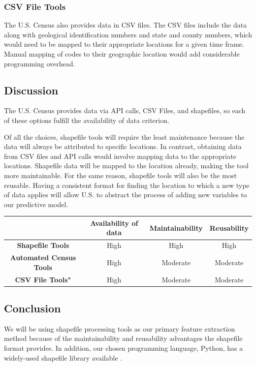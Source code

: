 \documentclass[onecolumn, draftclsnofoot,10pt, compsoc]{IEEEtran}
\begin{document}
        \subsubsection{CSV File Tools}
        The U.S. Census also provides data in CSV files. 
        The CSV files include the data along with geological identification numbers and state and county numbers, which would need to be mapped to their appropriate locations for a given time frame. 
        Manual mapping of codes to their geographic location would add considerable programming overhead.
    
    \subsection{Discussion}
    The U.S. Census provides data via API calls, CSV Files, and shapefiles, so each of these options fulfill the availability of data criterion.
    
    Of all the choices, shapefile tools will require the least maintenance because the data will always be attributed to specific locations.
    In contrast, obtaining data from CSV files and API calls would involve mapping data to the appropriate locations.
    Shapefile data will be mapped to the location already, making the tool more maintainable.
    For the same reason, shapefile tools will also be the most reusable.
    Having a consistent format for finding the location to which a new type of data applies will allow U.S. to abstract the process of adding new variables to our predictive model.
    
    \begin{center}
    \begin{tabular}{ |c|c|c|c| } 
    \hline
     & \textbf{Availability of data} 
     & \textbf{Maintainability}
     & \textbf{Reusability} \\
     \hline
     \textbf{Shapefile Tools}
     & High 
     & High 
     & High \\
     \hline
     \textbf{Automated Census Tools }
     & High 
     & Moderate
     & Moderate \\ 
     \hline
     \textbf{CSV File Tools"}
     & High
     & Moderate 
     & Moderate\\
    \hline
    \end{tabular}
    \end{center}
    
    \subsection{Conclusion}
    We will be using shapefile processing tools as our primary feature extraction method because of the maintainability and reusability advantages the shapefile format provides. 
    In addition, our chosen programming language, Python, has a widely-used shapefile library available \cite{PyShapefile}.
\end{document}
